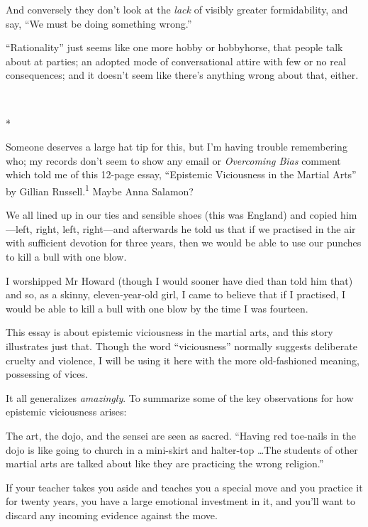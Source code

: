 {
 And conversely they don't look at the
\textit{lack} of visibly greater formidability, and say,
``We must be doing something
wrong.''}

{
 ``Rationality'' just seems like
one more hobby or hobbyhorse, that people talk about at parties; an
adopted mode of conversational attire with few or no real consequences;
and it doesn't seem like there's
anything wrong about that, either.}

{\centering
 \ ~
\par}

{\centering
 *
\par}


{
 Someone deserves a large hat tip for this, but I'm
having trouble remembering who; my records don't seem
to show any email or \textit{Overcoming Bias} comment which told me of
this 12-page essay, ``Epistemic Viciousness in the
Martial Arts'' by Gillian Russell.\textsuperscript{1}
Maybe Anna Salamon?}

{
 We all lined up in our ties and sensible shoes (this was England)
and copied him---left, right, left, right---and afterwards he told us
that if we practised in the air with sufficient devotion for three
years, then we would be able to use our punches to kill a bull with one
blow.}

{
 I worshipped Mr Howard (though I would sooner have died than told
him that) and so, as a skinny, eleven-year-old girl, I came to believe
that if I practised, I would be able to kill a bull with one blow by
the time I was fourteen.}

{
 This essay is about epistemic viciousness in the martial arts, and
this story illustrates just that. Though the word
``viciousness'' normally suggests
deliberate cruelty and violence, I will be using it here with the more
old-fashioned meaning, possessing of vices.}

{
 It all generalizes \textit{amazingly}. To summarize some of the
key observations for how epistemic viciousness arises:}

{
 The art, the dojo, and the sensei are seen as sacred.
``Having red toe-nails in the dojo is like going to
church in a mini-skirt and halter-top \ldots The students of other
martial arts are talked about like they are practicing the wrong
religion.''}

{
 If your teacher takes you aside and teaches you a special move and
you practice it for twenty years, you have a large emotional investment
in it, and you'll want to discard any incoming evidence
against the move.}

